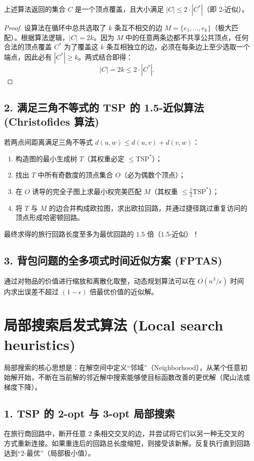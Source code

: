 \begin{theorem}
上述算法返回的集合 $C$ 是一个顶点覆盖，且大小满足 $|C| \le 2 \cdot |C^*|$（即 2-近似）。
\end{theorem}

\begin{proof}
设算法在循环中总共选取了 $k$ 条互不相交的边 $M = \{e_1, \dots, e_k\}$（极大匹配）。根据算法逻辑，$|C| = 2k$。因为 $M$ 中的任意两条边都不共享公共顶点，任何合法的顶点覆盖 $C^*$ 为了覆盖这 $k$ 条互相独立的边，必须在每条边上至少选取一个端点，因此必有 $|C^*| \ge k$。两式结合即得：
\[
|C| = 2k \le 2 \cdot |C^*|.
\]
\end{proof}

\subsection*{2. 满足三角不等式的 TSP 的 1.5-近似算法 (Christofides 算法)}
若两点间距离满足三角不等式 $d(u, w) \le d(u, v) + d(v, w)$：
\begin{enumerate}
    \item 构造图的最小生成树 $T$（其权重必定 $\le \text{TSP}^*$）；
    \item 找出 $T$ 中所有奇数度的顶点集合 $O$（必为偶数个顶点）；
    \item 在 $O$ 诱导的完全子图上求最小权完美匹配 $M$（其权重 $\le \frac{1}{2} \text{TSP}^*$）；
    \item 将 $T$ 与 $M$ 的边合并构成欧拉图，求出欧拉回路，并通过捷径跳过重复访问的顶点形成哈密顿回路。
\end{enumerate}
最终求得的旅行回路长度至多为最优回路的 $1.5$ 倍（1.5-近似）！

\subsection*{3. 背包问题的全多项式时间近似方案 (FPTAS)}
通过对物品的价值进行缩放和离散化取整，动态规划算法可以在 $O(n^3 / \epsilon)$ 时间内求出误差不超过 $(1 - \epsilon)$ 倍最优价值的近似解。

\section{局部搜索启发式算法 (Local search heuristics)}

局部搜索的核心思想是：在解空间中定义“邻域”（Neighborhood），从某个任意初始解开始，不断在当前解的邻近解中搜索能够使目标函数改善的更优解（爬山法或梯度下降）。

\subsection*{1. TSP 的 2-opt 与 3-opt 局部搜索}
在旅行商回路中，断开任意 2 条相交交叉的边，并尝试将它们以另一种无交叉的方式重新连接。如果重连后的回路总长度缩短，则接受该新解。反复执行直到回路达到“2-最优”（局部极小值）。

